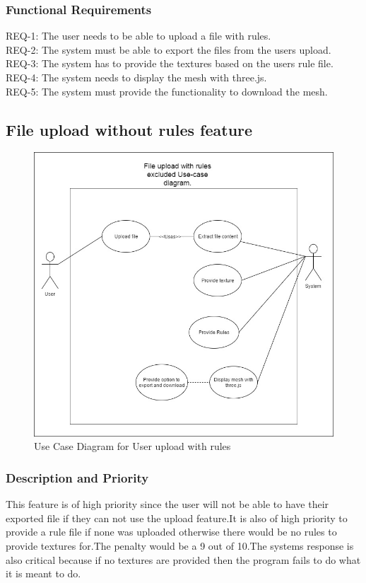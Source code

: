 \documentclass[english]{article}
\begin{document}
			 \subsubsection{Functional Requirements}
			 	REQ-1: The user needs to be able to upload a file with rules.\\
			 	REQ-2: The system must be able to export the files from the users upload.\\
			 	REQ-3: The system has to provide the textures based on the users rule file.\\
			 	REQ-4: The system needs to display the mesh with three.js.\\
			 	REQ-5: The system must provide the functionality to download the mesh.\\
			 \subsection{File upload without rules feature}
				\begin{figure}[h]
					\includegraphics[width=\textwidth]{norules.jpg}
					\caption{Use Case Diagram for User upload with rules }
				\end{figure}
			 \subsubsection{Description and Priority}
			 This feature is of high priority since the user will not be able to have their exported file if they can not use the upload feature.It is also of high priority to provide a rule file if none was uploaded otherwise there would be no rules to provide textures for.The penalty would be a 9 out of 10.The systems response is also critical because if no textures are provided then the program fails to do what it is meant to do. 
\end{document}
